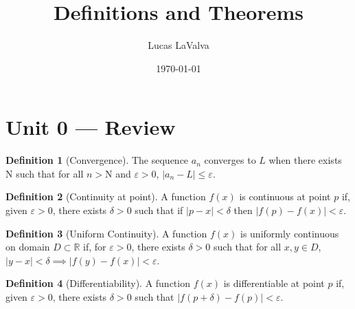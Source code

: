 \documentclass{article}
\title{Definitions and Theorems}
\author{Lucas LaValva}
\date{\today}
\theoremstyle{definition}
\newtheorem{definition}{Definition}[section]
\begin{document}
\maketitle

\section{Unit 0 --- Review}
\begin{definition}[Convergence]
    The sequence $a_n$ converges to $L$ when there exists
    N such that for all $n>\mathrm{N}$ and $\varepsilon>0$,
    $\left\lvert a_n-L\right\rvert\leq \varepsilon$.
\end{definition}
\begin{definition}[Continuity at point]
    A function $f(x)$ is continuous at point $p$ if, given
    $\varepsilon>0$, there exists $\delta>0$ such that if
    $\left\lvert p-x \right\rvert<\delta$ then
    $\left\lvert f(p)-f(x)\right\rvert<\varepsilon$.
\end{definition}
\begin{definition}[Uniform Continuity]
    A function $f(x)$ is uniformly continuous on domain
    $D\subset \mathbb{R}$ if, for $\varepsilon>0$, there
    exists $\delta>0$ such that for all $x,y\in  D$,
    $\left\lvert y-x\right\rvert<\delta \implies
        \left\lvert f(y)-f(x)\right\rvert <\varepsilon$.
\end{definition}
\begin{definition}[Differentiability]
    A function $f(x)$ is differentiable at point $p$ if,
    given $\varepsilon>0$, there exists $\delta>0$ such
    that $\left\lvert f(p+\delta)-f(p)\right\rvert
        <\varepsilon$.
\end{definition}

\end{document}
